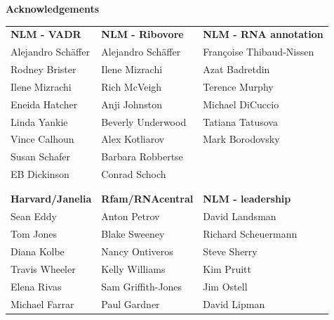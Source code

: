 \documentclass[landscape]{slides}
\begin{document}
\begin{slide}

\large
\begin{center}
\large{\textbf{Acknowledgements}} \\

\normalsize
\vspace{0.75in}

\small
\begin{tabular}{l|l|l}
\textbf{NLM - VADR}      & \textbf{NLM - Ribovore}   & \textbf{NLM - RNA annotation} \\
Alejandro Sch\"{a}ffer   & Alejandro Sch\"{a}ffer    &  Fran\c{c}oise Thibaud-Nissen \\
Rodney Brister           & Ilene Mizrachi            &  Azat Badretdin \\
Ilene Mizrachi           & Rich McVeigh              &  Terence Murphy \\
Eneida Hatcher           & Anji Johnston             &  Michael DiCuccio \\
Linda Yankie             & Beverly Underwood         &  Tatiana Tatusova \\
Vince Calhoun            & Alex Kotliarov            &  Mark Borodovsky \\
Susan Schafer            & Barbara Robbertse \\
EB Dickinson             & Conrad Schoch \\
& & \\ \hline
 & & \\    
\textbf{Harvard/Janelia} & \textbf{Rfam/RNAcentral} & \textbf{NLM - leadership} \\
Sean Eddy                &  Anton Petrov            & David Landsman \\
Tom Jones                &  Blake Sweeney           & Richard Scheuermann  \\
Diana Kolbe              &  Nancy Ontiveros         & Steve Sherry \\
Travis Wheeler           &  Kelly Williams          & Kim Pruitt  \\
Elena Rivas              &  Sam Griffith-Jones      & Jim Ostell \\
Michael Farrar           &  Paul Gardner            & David Lipman \\
\end{tabular}


\end{center}
\end{slide}
\end{document}
